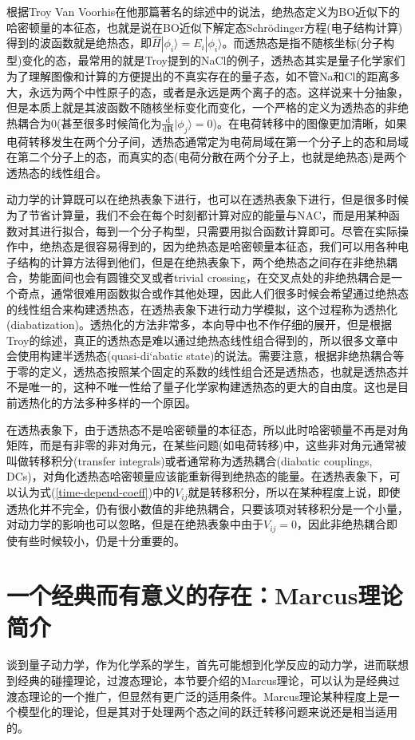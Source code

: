 \documentclass[12pt,a4paper,openany,twoside]{book}
\numberwithin{equation}{section}
\begin{document}
        根据Troy Van Voorhis在他那篇著名的综述\cite{VanVoorhis2010}中的说法，绝热态定义为BO近似下的哈密顿量的本征态，也就是说在BO近似下解定态Schr\"odinger方程(电子结构计算)得到的波函数就是绝热态，即$\hat{H}|\phi_i\rangle=E_i|\phi_i\rangle$。而透热态是指不随核坐标(分子构型)变化的态，最常用的就是Troy提到的NaCl的例子，透热态其实是量子化学家们为了理解图像和计算的方便提出的不真实存在的量子态，如不管Na和Cl的距离多大，永远为两个中性原子的态，或者是永远是两个离子的态。这样说来十分抽象，但是本质上就是其波函数不随核坐标变化而变化，一个严格的定义为透热态的非绝热耦合为0(甚至很多时候简化为$\frac{\mathrm{d}}{\mathrm{d}\mathbf{R}}|\phi_j\rangle=0$)。在电荷转移中的图像更加清晰，如果电荷转移发生在两个分子间，透热态通常定为电荷局域在第一个分子上的态和局域在第二个分子上的态，而真实的态(电荷分散在两个分子上，也就是绝热态)是两个透热态的线性组合。

        动力学的计算既可以在绝热表象下进行，也可以在透热表象下进行，但是很多时候为了节省计算量，我们不会在每个时刻都计算对应的能量与NAC，而是用某种函数对其进行拟合，每到一个分子构型，只需要用拟合函数计算即可。尽管在实际操作中，绝热态是很容易得到的，因为绝热态是哈密顿量本征态，我们可以用各种电子结构的计算方法得到他们，但是在绝热表象下，两个绝热态之间存在非绝热耦合，势能面间也会有圆锥交叉或者trivial crossing，在交叉点处的非绝热耦合是一个奇点，通常很难用函数拟合或作其他处理，因此人们很多时候会希望通过绝热态的线性组合来构建透热态，在透热表象下进行动力学模拟，这个过程称为透热化(diabatization)。透热化的方法非常多，本向导中也不作仔细的展开，但是根据Troy的综述，真正的透热态是难以通过绝热态线性组合得到的，所以很多文章中会使用构建半透热态(quasi-di`abatic state)的说法。需要注意，根据非绝热耦合等于零的定义，透热态按照某个固定的系数的线性组合还是透热态，也就是透热态并不是唯一的，这种不唯一性给了量子化学家构建透热态的更大的自由度。这也是目前透热化的方法多种多样的一个原因。

        在透热表象下，由于透热态不是哈密顿量的本征态，所以此时哈密顿量不再是对角矩阵，而是有非零的非对角元，在某些问题(如电荷转移)中，这些非对角元通常被叫做转移积分(transfer integrals)或者通常称为透热耦合(diabatic couplings, DCs)，对角化透热态哈密顿量应该能重新得到绝热态的能量。在透热表象下，可以认为式(\ref{time-depend-coeff})中的$V_{ij}$就是转移积分，所以在某种程度上说，即使透热化并不完全，仍有很小数值的非绝热耦合，只要该项对转移积分是一个小量，对动力学的影响也可以忽略，但是在绝热表象中由于$V_{ij}=0$，因此非绝热耦合即使有些时候较小，仍是十分重要的。
      \section{一个经典而有意义的存在：Marcus理论简介}
        谈到量子动力学，作为化学系的学生，首先可能想到化学反应的动力学，进而联想到经典的碰撞理论，过渡态理论，本节要介绍的Marcus理论，可以认为是经典过渡态理论的一个推广，但显然有更广泛的适用条件。Marcus理论某种程度上是一个模型化的理论，但是其对于处理两个态之间的跃迁转移问题来说还是相当适用的。
\end{document}
